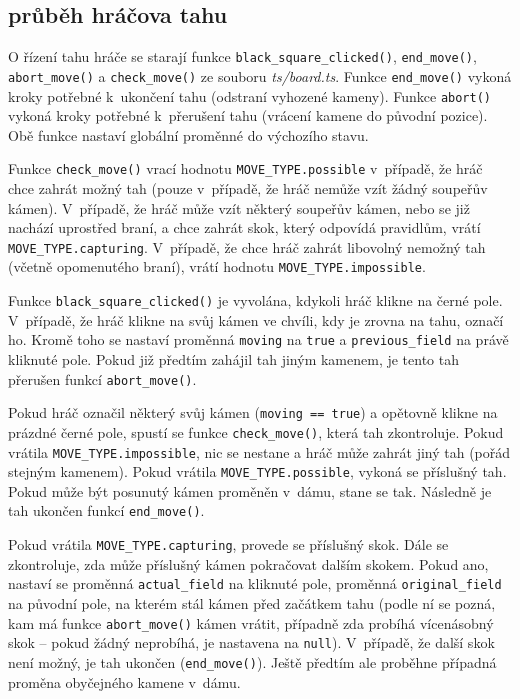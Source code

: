 \documentclass[a4paper,12pt]{article}
\begin{document}
	\subsection{průběh hráčova tahu}
	O řízení tahu hráče se starají funkce \verb|black_square_clicked()|, \verb|end_move()|, \verb|abort_move()| a \verb|check_move()|
	ze souboru \textit{ts/board.ts}. Funkce \verb|end_move()| vykoná kroky potřebné k~ukončení tahu (odstraní vyhozené kameny). Funkce
	\verb|abort()| vykoná kroky potřebné k~přerušení tahu (vrácení kamene do původní pozice). Obě funkce nastaví globální proměnné
	do výchozího stavu.
	
	Funkce \verb|check_move()| vrací hodnotu \texttt{MOVE\_TYPE.possible} v~případě, že hráč chce zahrát možný tah
    (pouze v~případě, že hráč nemůže vzít žádný soupeřův kámen). V~případě, že hráč může vzít některý soupeřův kámen, nebo se již nachází
    uprostřed braní, a chce zahrát skok, který odpovídá pravidlům, vrátí \texttt{MOVE\_TYPE.capturing}. V~případě, že chce hráč zahrát libovolný
    nemožný tah (včetně opomenutého braní), vrátí hodnotu \texttt{MOVE\_TYPE.impossible}.
    
    Funkce \verb|black_square_clicked()| je vyvolána, kdykoli hráč klikne na černé pole. V~případě, že hráč klikne na svůj kámen ve chvíli,
    kdy je zrovna na tahu, označí ho. Kromě toho se nastaví proměnná \texttt{moving} na \texttt{true} a \texttt{previous\_field} na právě
    kliknuté pole. Pokud již předtím zahájil tah jiným kamenem, je tento tah přerušen funkcí \verb|abort_move()|.
    
    Pokud hráč označil některý svůj kámen (\texttt{moving == true}) a opětovně klikne na prázdné černé pole, spustí se funkce \verb|check_move()|,
    která tah zkontroluje. Pokud vrátila \texttt{MOVE\_TYPE.impossible}, nic se nestane a hráč může zahrát jiný tah (pořád stejným kamenem).
    Pokud vrátila \texttt{MOVE\_TYPE.possible}, vykoná se příslušný tah. Pokud může být posunutý kámen proměněn v~dámu, stane se tak. Následně
    je tah ukončen funkcí \verb|end_move()|.
    
    Pokud vrátila \texttt{MOVE\_TYPE.capturing}, provede se příslušný skok. Dále se zkontroluje, zda může příslušný kámen pokračovat dalším skokem.
    Pokud ano, nastaví se proměnná \texttt{actual\_field} na kliknuté pole, proměnná \texttt{original\_field} na původní pole, na kterém stál kámen
    před začátkem tahu (podle ní se pozná, kam má funkce \verb|abort_move()| kámen vrátit, případně zda probíhá vícenásobný skok -- pokud žádný
    neprobíhá, je nastavena na \texttt{null}). V~případě, že další skok není možný, je tah ukončen (\verb|end_move()|). Ještě předtím ale proběhne 
    případná proměna obyčejného kamene v~dámu.
	
\end{document}
